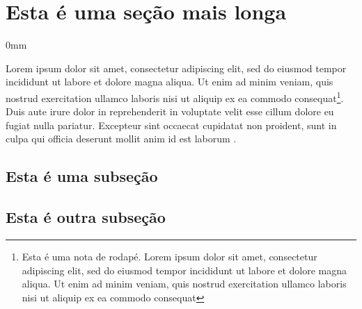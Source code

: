 \documentclass[./main.tex]{subfiles}
\begin{document}
\section{Esta é uma seção mais longa} \label{sec_b}

\begin{adjustwidth}{\bodytab}{0mm}

\par Lorem ipsum dolor sit amet, consectetur adipiscing elit, sed do eiusmod tempor incididunt ut labore et dolore magna aliqua. Ut enim ad minim veniam, quis nostrud exercitation ullamco laboris nisi ut aliquip ex ea commodo consequat\footnote{Esta é uma nota de rodapé. Lorem ipsum dolor sit amet, consectetur adipiscing elit, sed do eiusmod tempor incididunt ut labore et dolore magna aliqua. Ut enim ad minim veniam, quis nostrud exercitation ullamco laboris nisi ut aliquip ex ea commodo consequat}. Duis aute irure dolor in reprehenderit in voluptate velit esse cillum dolore eu fugiat nulla pariatur. Excepteur sint occaecat cupidatat non proident, sunt in culpa qui officia deserunt mollit anim id est laborum \cite{Pearce2002a}.

\subsection{Esta é uma subseção} \label{sec_b:a}









\subsection{Esta é outra subseção} \label{sec_b:c}





\end{adjustwidth}



\clearpage
\end{document}
